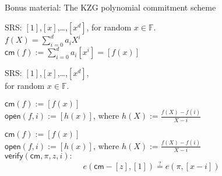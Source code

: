 \documentclass[shadesubsections,trans,14pt,mathserif]{beamer}
\newcommand{\F}{\ensuremath{\mathbb F}}
\newcommand{\enc}[1]{\ensuremath{\left[#1\right ]}}
\newcommand{\cm}{\ensuremath{\mathsf{cm}}}
\newcommand{\open}[1]{\ensuremath{\mathsf{open}(#1)}}
\newcommand{\verify}[1]{\ensuremath{\mathsf{verify}(#1)}}
\newcommand{\defeq}{\ensuremath{:=}}
\begin{document}
\begin{frame}
\large{Bonus material: The KZG polynomial commitment scheme
}

\end{frame}

\begin{frame}
 SRS: \enc{1},\enc{x},\ldots,\enc{x^d}, for random $x\in \F$.\\
 \vspace{0.4in}
 $f(X) = \sum_{i=0}^d a_i X^i$\\
 \vspace{0.4in}
 $\cm(f)\defeq  \sum_{i=0}^d a_i \enc{x^i}=  \enc{f(x)}$\\
 \vspace{0.4in}
 
\end{frame}
\begin{frame}
 SRS: \enc{1},\enc{x},\ldots,\enc{x^d},\\
 for random $x\in \F$.
 \vspace{0.4in}
 
 $\cm(f)\defeq   \enc{f(x)}$\\
 \vspace{0.4in}
$\open{f,i}\defeq \enc{h(x)}$, where
$h(X)\defeq \frac{f(X)-f(i)}{X-i}$
 \vspace{0.4in}
 
\end{frame}

% 




\begin{frame}

 $\cm(f)\defeq   \enc{f(x)}$\\
 \vspace{0.4in}
$\open{f,i}\defeq \enc{h(x)}$, where
 $h(X)\defeq \frac{f(X)-f(i)}{X-i}$\\
 \vspace{0.4in}
 $\verify{\cm,\pi,z,i}:$
\[e(\cm-\enc{z},\enc{1}) \stackrel{?}{=} e(\pi, \enc{x-i})\]
\end{frame}
\end{document}
